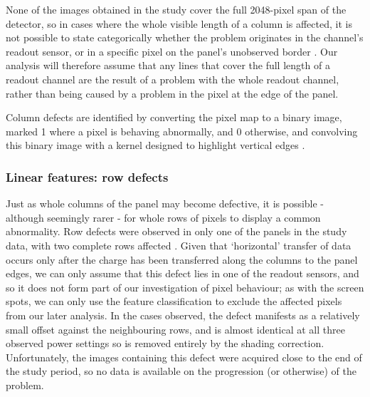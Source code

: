 \documentclass[\main/IO-Pixels.tex]{subfiles}
\begin{document}

None of the images obtained in the study cover the full 2048-pixel span of the detector, so in cases where the whole visible length of a column is affected, it is not possible to state categorically whether the problem originates in the channel's readout sensor, or in a specific pixel on the panel's unobserved border . Our analysis will therefore assume that any lines that cover the full length of a readout channel are the result of a problem with the whole readout channel, rather than being caused by a problem in the pixel at the edge of the panel.

Column defects are identified by converting the pixel map to a binary image, marked 1 where a pixel is behaving abnormally, and 0 otherwise, and convolving this binary image with a kernel designed to highlight vertical edges . 


\subsubsection{Linear features: row defects}

Just as whole columns of the panel may become defective, it is possible - although seemingly rarer - for whole rows of pixels to display a common abnormality. Row defects were observed in only one of the panels in the study data, with two complete rows affected . Given that `horizontal' transfer of data occurs only after the charge has been transferred along the columns to the panel edges, we can only assume that this defect lies in one of the readout sensors, and so it does not form part of our investigation of pixel behaviour; as with the screen spots, we can only use the feature classification to exclude the affected pixels from our later analysis. In the cases observed, the defect manifests as a relatively small offset against the neighbouring rows, and is almost identical at all three observed power settings so is removed entirely by the shading correction. Unfortunately, the images containing this defect were acquired close to the end of the study period, so no data is available on the progression (or otherwise) of the problem. 
\end{document}
